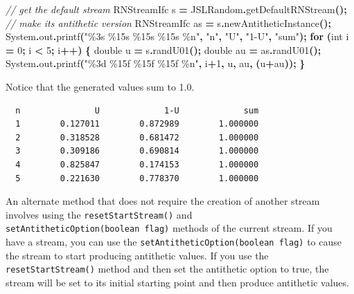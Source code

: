 \documentclass[
]{book}
\newenvironment{Shaded}{\begin{snugshade}}{\end{snugshade}}
\newcommand{\BuiltInTok}[1]{#1}
\newcommand{\CommentTok}[1]{\textcolor[rgb]{0.56,0.35,0.01}{\textit{#1}}}
\newcommand{\ControlFlowTok}[1]{\textcolor[rgb]{0.13,0.29,0.53}{\textbf{#1}}}
\newcommand{\DataTypeTok}[1]{\textcolor[rgb]{0.13,0.29,0.53}{#1}}
\newcommand{\DecValTok}[1]{\textcolor[rgb]{0.00,0.00,0.81}{#1}}
\newcommand{\FunctionTok}[1]{\textcolor[rgb]{0.00,0.00,0.00}{#1}}
\newcommand{\NormalTok}[1]{#1}
\newcommand{\OperatorTok}[1]{\textcolor[rgb]{0.81,0.36,0.00}{\textbf{#1}}}
\newcommand{\SpecialCharTok}[1]{\textcolor[rgb]{0.00,0.00,0.00}{#1}}
\newcommand{\StringTok}[1]{\textcolor[rgb]{0.31,0.60,0.02}{#1}}
\theoremstyle{definition}
\theoremstyle{definition}
\theoremstyle{definition}
\theoremstyle{definition}
\theoremstyle{remark}
\begin{document}
\begin{Shaded}
\begin{Highlighting}[]
\CommentTok{// get the default stream}
\NormalTok{RNStreamIfc s }\OperatorTok{=}\NormalTok{ JSLRandom}\OperatorTok{.}\FunctionTok{getDefaultRNStream}\OperatorTok{();}
\CommentTok{// make its antithetic version}
\NormalTok{RNStreamIfc as }\OperatorTok{=}\NormalTok{ s}\OperatorTok{.}\FunctionTok{newAntitheticInstance}\OperatorTok{();}
\BuiltInTok{System}\OperatorTok{.}\FunctionTok{out}\OperatorTok{.}\FunctionTok{printf}\OperatorTok{(}\StringTok{"}\SpecialCharTok{\%3s}\StringTok{ }\SpecialCharTok{\%15s}\StringTok{ }\SpecialCharTok{\%15s}\StringTok{ }\SpecialCharTok{\%15s}\StringTok{ }\SpecialCharTok{\%n}\StringTok{"}\OperatorTok{,} \StringTok{"n"}\OperatorTok{,} \StringTok{"U"}\OperatorTok{,} \StringTok{"1{-}U"}\OperatorTok{,} \StringTok{"sum"}\OperatorTok{);}
\ControlFlowTok{for} \OperatorTok{(}\DataTypeTok{int}\NormalTok{ i }\OperatorTok{=} \DecValTok{0}\OperatorTok{;}\NormalTok{ i }\OperatorTok{\textless{}} \DecValTok{5}\OperatorTok{;}\NormalTok{ i}\OperatorTok{++)} \OperatorTok{\{}
    \DataTypeTok{double}\NormalTok{ u }\OperatorTok{=}\NormalTok{ s}\OperatorTok{.}\FunctionTok{randU01}\OperatorTok{();}
    \DataTypeTok{double}\NormalTok{ au }\OperatorTok{=}\NormalTok{ as}\OperatorTok{.}\FunctionTok{randU01}\OperatorTok{();}
    \BuiltInTok{System}\OperatorTok{.}\FunctionTok{out}\OperatorTok{.}\FunctionTok{printf}\OperatorTok{(}\StringTok{"}\SpecialCharTok{\%3d}\StringTok{ }\SpecialCharTok{\%15f}\StringTok{ }\SpecialCharTok{\%15f}\StringTok{ }\SpecialCharTok{\%15f}\StringTok{ }\SpecialCharTok{\%n}\StringTok{"}\OperatorTok{,}\NormalTok{ i}\OperatorTok{+}\DecValTok{1}\OperatorTok{,}\NormalTok{ u}\OperatorTok{,}\NormalTok{ au}\OperatorTok{,} \OperatorTok{(}\NormalTok{u}\OperatorTok{+}\NormalTok{au}\OperatorTok{));}
\OperatorTok{\}}
\end{Highlighting}
\end{Shaded}

Notice that the generated values sum to 1.0.

\begin{verbatim}
  n               U             1-U             sum 
  1        0.127011        0.872989        1.000000 
  2        0.318528        0.681472        1.000000 
  3        0.309186        0.690814        1.000000 
  4        0.825847        0.174153        1.000000 
  5        0.221630        0.778370        1.000000 
\end{verbatim}

An alternate method that does not require the creation of another stream involves using the \texttt{resetStartStream()} and \texttt{setAntitheticOption(boolean\ flag)} methods of the current stream. If you have a stream, you can use the \texttt{setAntitheticOption(boolean\ flag)} to cause the stream to start producing antithetic values. If you use the \texttt{resetStartStream()} method and then set the antithetic option to true, the stream will be set to its initial starting point and then produce antithetic values.
\end{document}
